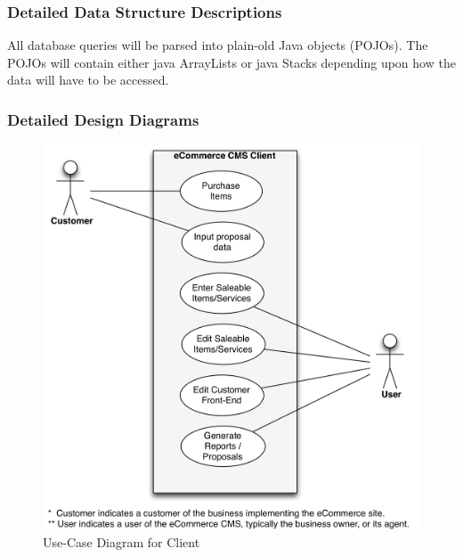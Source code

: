 \documentclass{article}
\begin{document}
\subsubsection{Detailed Data Structure Descriptions}
\label{ddsd}

All database queries will be parsed into plain-old Java objects (POJOs).  The
POJOs will contain either java ArrayLists or java Stacks depending upon how
the data will have to be accessed.


\subsubsection{Detailed Design Diagrams}
\label{ddd}

\begin{figure}[H]
\centering
\includegraphics[width=4.5in]{../../UML/eccms-Use Case (Client) Diagram.png}
\caption{Use-Case Diagram for Client}
\label{client-usecase}
\end{figure}
\end{document}
